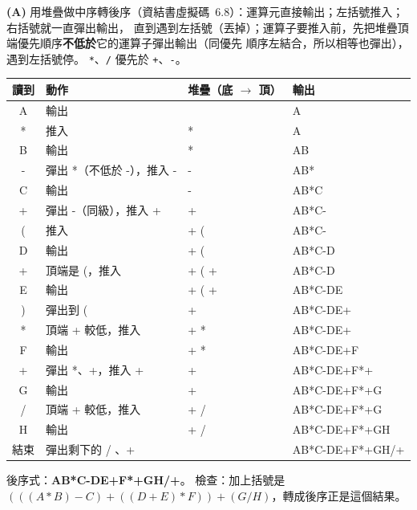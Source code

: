 \begin{pastsoln}
\textbf{(A)} 用堆疊做中序轉後序（資結書虛擬碼~6.8）：運算元直接輸出；左括號推入；右括號就一直彈出輸出，
直到遇到左括號（丟掉）；運算子要推入前，先把堆疊頂端優先順序\textbf{不低於}它的運算子彈出輸出（同優先
順序左結合，所以相等也彈出），遇到左括號停。 \texttt{*}、\texttt{/} 優先於 \texttt{+}、\texttt{-}。
\begin{center}
\small
\begin{tabular}{clll}
\toprule
讀到 & 動作 & 堆疊（底 $\to$ 頂） & 輸出 \\
\midrule
A & 輸出 & & A \\
* & 推入 & * & A \\
B & 輸出 & * & AB \\
- & 彈出 *（不低於 -），推入 - & - & AB* \\
C & 輸出 & - & AB*C \\
+ & 彈出 -（同級），推入 + & + & AB*C- \\
( & 推入 & + ( & AB*C- \\
D & 輸出 & + ( & AB*C-D \\
+ & 頂端是 (，推入 & + ( + & AB*C-D \\
E & 輸出 & + ( + & AB*C-DE \\
) & 彈出到 ( & + & AB*C-DE+ \\
* & 頂端 + 較低，推入 & + * & AB*C-DE+ \\
F & 輸出 & + * & AB*C-DE+F \\
+ & 彈出 *、+，推入 + & + & AB*C-DE+F*+ \\
G & 輸出 & + & AB*C-DE+F*+G \\
/ & 頂端 + 較低，推入 & + / & AB*C-DE+F*+G \\
H & 輸出 & + / & AB*C-DE+F*+GH \\
結束 & 彈出剩下的 / 、+ & & AB*C-DE+F*+GH/+ \\
\bottomrule
\end{tabular}
\end{center}
後序式：\textbf{AB*C-DE+F*+GH/+}。 檢查：加上括號是 $(((A*B)-C)+((D+E)*F))+(G/H)$，轉成後序正是這個結果。


\end{pastsoln}

